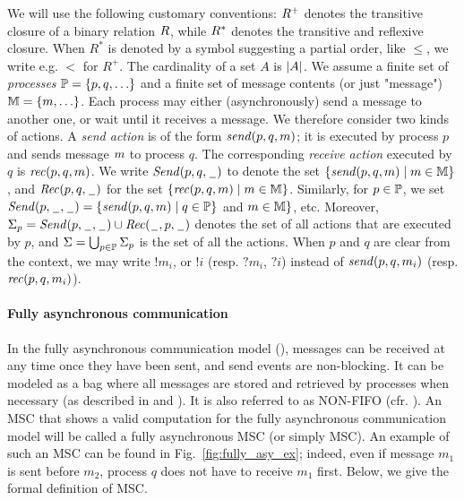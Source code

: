 We will use the following customary conventions:  $\mathbin{R}^+$ denotes the transitive closure of a binary relation $\mathbin{R}$, while $\mathbin{R}^*$ denotes the transitive and reflexive closure. When $R^*$ is denoted by a symbol suggesting 
a partial order, like $\leq$, we write e.g. 
$<$ for $R^+$.  The cardinality of a set $A$ is  $| A |$.
%
We assume a finite set of \emph{processes} $\mathbb{P}=\{p,q,\ldots\}$ and a finite set of message contents (or just "message") $\mathbb{M}=\{m,\ldots\}$.
Each process may either (asynchronously) send a message to another one, or wait until it receives a message.
We therefore consider two kinds of actions. A \emph{send action} is of the form $\mathit{send}(p, q, m)$;
it is executed by process $p$ and sends message $m$ to process $q$.
The corresponding \emph{receive action} executed by $q$ is $\mathit{rec}(p, q, m)$.
%
We write ${\mathit{Send}(p,q,\hspace{0.1em}\underline{\hspace{0.5em}}\hspace{0.1em})}$ to denote the set $\{\mathit{send}(p, q, m) \mid m \in \mathbb{M}\}$, and
${\mathit{Rec}(p,q,\hspace{0.1em}\underline{\hspace{0.5em}}\hspace{0.1em})}$ for the set $\{\mathit{rec}(p, q, m) \mid m \in \mathbb{M}\}$.
Similarly, for $p \in \mathbb{P}$, we set
${\mathit{Send}(p,\hspace{0.1em}\underline{\hspace{0.5em}}\hspace{0.1em},\hspace{0.1em}\underline{\hspace{0.5em}}\hspace{0.1em})} = \{\mathit{send}(p, q, m) \mid q \in \mathbb{P}
\}$ and $m \in \mathbb{M}\}$, etc.
Moreover, $\Sigma_{p} = {\mathit{Send}(p,\hspace{0.1em}\underline{\hspace{0.5em}}\hspace{0.1em},\hspace{0.1em}\underline{\hspace{0.5em}}\hspace{0.1em})} \cup {\mathit{Rec}(\hspace{0.1em}\underline{\hspace{0.5em}}\hspace{0.1em},p,\hspace{0.1em}\underline{\hspace{0.5em}}\hspace{0.1em})}$ denotes the set of all actions that are
executed by $p$, and $\Sigma = \bigcup_{p \in \mathbb{P}} \Sigma_{p}$
is the set of all the actions. When $p$ and $q$
are clear from the context, we may write $!m_i$,
or $!i$ (resp. $?m_i$, $?i$) instead of $\mathit{send}(p, q, m_i)$ (resp. $\mathit{rec}(p, q, m_i)$).


\paragraph{\bf Fully asynchronous communication}
In the fully asynchronous communication model (\asy), messages can be received at any time once they have been sent, and send events are non-blocking.
It can be modeled as a bag where all messages are stored and retrieved by processes when necessary (as described in \cite{DBLP:journals/fac/ChevrouHQ16} and \cite{DBLP:journals/tcs/BasuB16}).
It is also referred to as NON-FIFO (cfr.  \cite{DBLP:journals/dc/Charron-BostMT96}).
An MSC that shows a valid computation for the fully asynchronous communication model will be called a fully asynchronous MSC (or simply MSC). An example of such an MSC can be found in Fig.~\ref{fig:fully_asy_ex}; indeed, even if message $m_1$ is sent before $m_2$, process $q$ does not have to receive $m_1$ first. Below, we give the formal definition of MSC.

